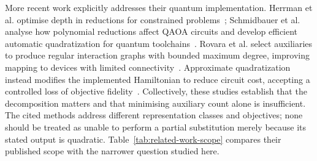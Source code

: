 \documentclass[a4paper,onecolumn,11pt,unpublished]{quantumarticle}
\theoremstyle{remark}
\begin{document}
More recent work explicitly addresses their quantum implementation.
Herrman et al. optimise depth in reductions for constrained
problems~\cite{Herrman2021}; Schmidbauer et al. analyse how polynomial
reductions affect QAOA circuits and develop efficient automatic
quadratization for quantum toolchains~\cite{Schmidbauer2024,Schmidbauer2026}.
Rovara et al. select auxiliaries to produce regular interaction graphs with
bounded maximum degree, improving mapping to devices with limited
connectivity~\cite{Rovara2026}. Approximate quadratization instead modifies the
implemented Hamiltonian to reduce circuit cost, accepting a controlled loss of
objective fidelity~\cite{Dragoi2026}. Collectively, these studies establish that
the decomposition matters and that minimising auxiliary count alone is
insufficient. The cited methods address different representation classes and objectives; none should be treated as unable to perform a partial substitution merely because its stated output is quadratic. Table~\ref{tab:related-work-scope} compares their published scope with the narrower question studied here.
\end{document}
